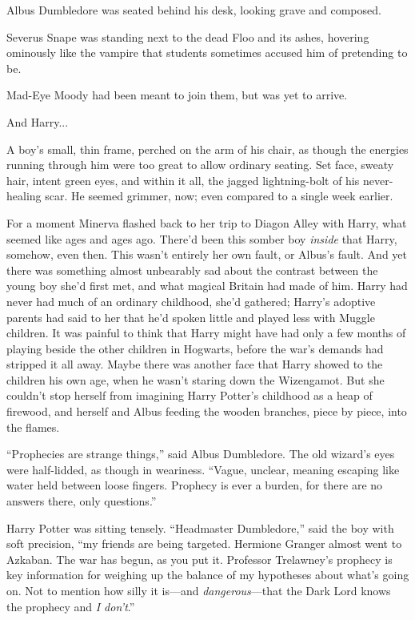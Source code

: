 Albus Dumbledore was seated behind his desk, looking grave and composed.

Severus Snape was standing next to the dead Floo and its ashes, hovering ominously like the vampire that students sometimes accused him of pretending to be.

Mad-Eye Moody had been meant to join them, but was yet to arrive.

And Harry...

A boy’s small, thin frame, perched on the arm of his chair, as though the energies running through him were too great to allow ordinary seating. Set face, sweaty hair, intent green eyes, and within it all, the jagged lightning-bolt of his never-healing scar. He seemed grimmer, now; even compared to a single week earlier.

For a moment Minerva flashed back to her trip to Diagon Alley with Harry, what seemed like ages and ages ago. There’d been this somber boy \emph{inside} that Harry, somehow, even then. This wasn’t entirely her own fault, or Albus’s fault. And yet there was something almost unbearably sad about the contrast between the young boy she’d first met, and what magical Britain had made of him. Harry had never had much of an ordinary childhood, she’d gathered; Harry’s adoptive parents had said to her that he’d spoken little and played less with Muggle children. It was painful to think that Harry might have had only a few months of playing beside the other children in Hogwarts, before the war’s demands had stripped it all away. Maybe there was another face that Harry showed to the children his own age, when he wasn’t staring down the Wizengamot. But she couldn’t stop herself from imagining Harry Potter’s childhood as a heap of firewood, and herself and Albus feeding the wooden branches, piece by piece, into the flames.

“Prophecies are strange things,” said Albus Dumbledore. The old wizard’s eyes were half-lidded, as though in weariness. “Vague, unclear, meaning escaping like water held between loose fingers. Prophecy is ever a burden, for there are no answers there, only questions.”

Harry Potter was sitting tensely. “Headmaster Dumbledore,” said the boy with soft precision, “my friends are being targeted. Hermione Granger almost went to Azkaban. The war has begun, as you put it. Professor Trelawney’s prophecy is key information for weighing up the balance of my hypotheses about what’s going on. Not to mention how silly it is—and \emph{dangerous}—that the Dark Lord knows the prophecy and \emph{I don’t}.”

